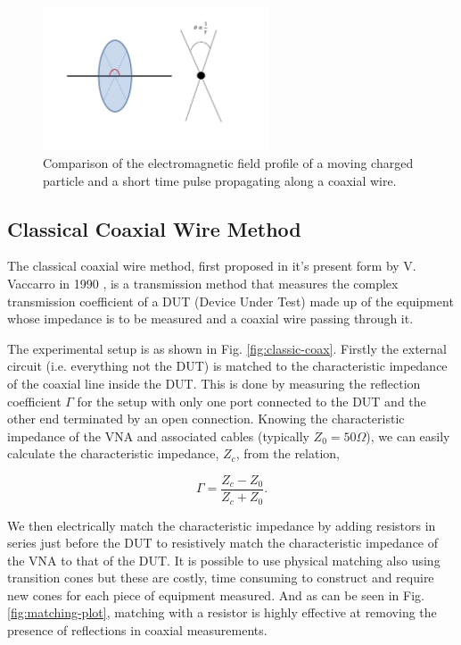 \documentclass[12pt,a4paper,twopage,openright]{article}
\begin{document}
\begin{figure}
\begin{center}
\includegraphics[width=0.6\textwidth]{figures/coaxial-particle-fields.pdf}
\end{center}
\caption{Comparison of the electromagnetic field profile of a moving charged particle and a short time pulse propagating along a coaxial wire.}
\label{fig:coax-part-profile}
\end{figure}

\subsection{Classical Coaxial Wire Method}

The classical coaxial wire method, first proposed in it's present form by V. Vaccarro in 1990 \cite{Vaccaro:ImprovedWireMeth}, is a transmission method that measures the complex transmission coefficient of a DUT (Device Under Test) made up of the equipment whose impedance is to be measured and a coaxial wire passing through it. 

The experimental setup is as shown in Fig. \ref{fig:classic-coax}. Firstly the external circuit (i.e. everything not the DUT) is matched to the characteristic impedance of the coaxial line inside the DUT. This is done by measuring the reflection coefficient $\Gamma$ for the setup with only one port connected to the DUT and the other end terminated by an open connection. Knowing the characteristic impedance of the VNA and associated cables (typically $Z_{0} = 50\Omega$), we can easily calculate the characteristic impedance, $Z_{c}$, from the relation,

\begin{equation}
\Gamma = \frac{Z_{c} - Z_{0}}{Z_{c} + Z_{0}}.
\end{equation}

We then electrically match the characteristic impedance by adding resistors in series just before the DUT to resistively match the characteristic impedance of the VNA to that of the DUT. It is possible to use physical matching also using transition cones but these are costly, time consuming to construct and require new cones for each piece of equipment measured. And as can be seen in Fig. \ref{fig:matching-plot}, matching with a resistor is highly effective at removing the presence of reflections in coaxial measurements.
\end{document}
